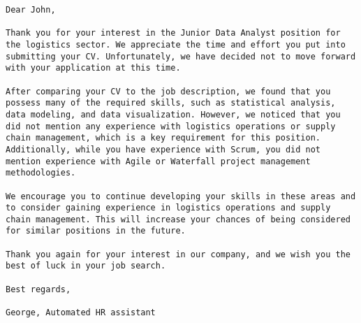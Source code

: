 \documentclass[
  letterpaper,
  DIV=11,
  numbers=noendperiod]{scrartcl}
\begin{document}
\begin{verbatim}
Dear John,

Thank you for your interest in the Junior Data Analyst position for the logistics sector. We appreciate the time and effort you put into submitting your CV. Unfortunately, we have decided not to move forward with your application at this time.

After comparing your CV to the job description, we found that you possess many of the required skills, such as statistical analysis, data modeling, and data visualization. However, we noticed that you did not mention any experience with logistics operations or supply chain management, which is a key requirement for this position. Additionally, while you have experience with Scrum, you did not mention experience with Agile or Waterfall project management methodologies.

We encourage you to continue developing your skills in these areas and to consider gaining experience in logistics operations and supply chain management. This will increase your chances of being considered for similar positions in the future.

Thank you again for your interest in our company, and we wish you the best of luck in your job search.

Best regards,

George, Automated HR assistant
\end{verbatim}
\end{document}
